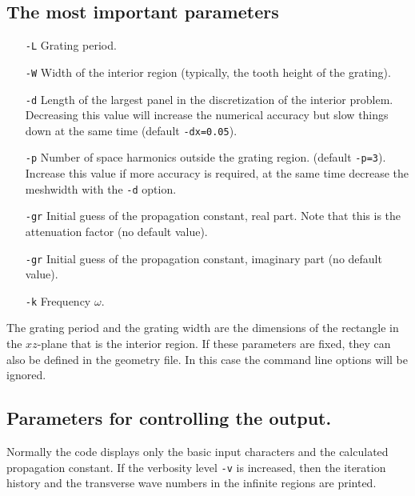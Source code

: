 \documentclass{article}
\begin{document}
\subsection{The most important parameters}
\begin{itemize}
  \item[\texttt{-L}] Grating period.
  \item[\texttt{-W}] Width of the interior region (typically, the
  tooth height of the grating). 
  \item[\texttt{-d}] Length of the largest panel in the discretization
  of the interior problem. Decreasing this value will increase the
  numerical accuracy but slow things down at the same time 
  (default \texttt{-dx=0.05}).
  \item[\texttt{-p}] Number of space harmonics outside the grating region.
  (default \texttt{-p=3}). Increase this value if more accuracy is
  required, at the same time decrease the meshwidth with the
  \texttt{-d} option. 
  \item[\texttt{-gr}] Initial guess of the propagation constant, real
  part. Note that this is the attenuation factor (no default value).
  \item[\texttt{-gr}] Initial guess of the propagation constant, imaginary
  part (no default value).
  \item[\texttt{-k}] Frequency $\omega$. 
\end{itemize}
The grating period and the grating width are the dimensions of the
rectangle in the $xz$-plane that is the interior region. If these
parameters are fixed, they can also be defined in the geometry file.
In this case the command line options will be ignored.

\subsection{Parameters for controlling the output.}
Normally the code displays only the basic input characters and the
calculated propagation constant. If the verbosity level \texttt{-v} is
increased, then the iteration history and the transverse wave numbers
in the infinite regions are printed. 
\end{document}
